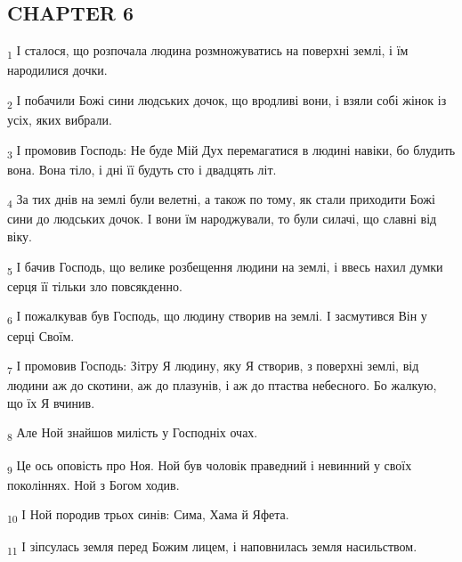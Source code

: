 \subsection{CHAPTER 6}
\begin{tcolorbox}
\textsubscript{1} І сталося, що розпочала людина розмножуватись на поверхні землі, і їм народилися дочки.
\end{tcolorbox}
\begin{tcolorbox}
\textsubscript{2} І побачили Божі сини людських дочок, що вродливі вони, і взяли собі жінок із усіх, яких вибрали.
\end{tcolorbox}
\begin{tcolorbox}
\textsubscript{3} І промовив Господь: Не буде Мій Дух перемагатися в людині навіки, бо блудить вона. Вона тіло, і дні її будуть сто і двадцять літ.
\end{tcolorbox}
\begin{tcolorbox}
\textsubscript{4} За тих днів на землі були велетні, а також по тому, як стали приходити Божі сини до людських дочок. І вони їм народжували, то були силачі, що славні від віку.
\end{tcolorbox}
\begin{tcolorbox}
\textsubscript{5} І бачив Господь, що велике розбещення людини на землі, і ввесь нахил думки серця її тільки зло повсякденно.
\end{tcolorbox}
\begin{tcolorbox}
\textsubscript{6} І пожалкував був Господь, що людину створив на землі. І засмутився Він у серці Своїм.
\end{tcolorbox}
\begin{tcolorbox}
\textsubscript{7} І промовив Господь: Зітру Я людину, яку Я створив, з поверхні землі, від людини аж до скотини, аж до плазунів, і аж до птаства небесного. Бо жалкую, що їх Я вчинив.
\end{tcolorbox}
\begin{tcolorbox}
\textsubscript{8} Але Ной знайшов милість у Господніх очах.
\end{tcolorbox}
\begin{tcolorbox}
\textsubscript{9} Це ось оповість про Ноя. Ной був чоловік праведний і невинний у своїх поколіннях. Ной з Богом ходив.
\end{tcolorbox}
\begin{tcolorbox}
\textsubscript{10} І Ной породив трьох синів: Сима, Хама й Яфета.
\end{tcolorbox}
\begin{tcolorbox}
\textsubscript{11} І зіпсулась земля перед Божим лицем, і наповнилась земля насильством.
\end{tcolorbox}
